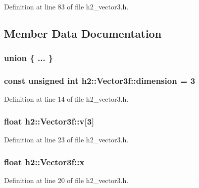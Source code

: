Definition at line 83 of file h2\-\_\-vector3.\-h.



\subsection{Member Data Documentation}
\hypertarget{classh2_1_1_vector3f_ab65d75ee198a9ae00e7fb5f0f8bb0b03}{\subsubsection[{"@17}]{\setlength{\rightskip}{0pt plus 5cm}union \{ ... \} }}\label{classh2_1_1_vector3f_ab65d75ee198a9ae00e7fb5f0f8bb0b03}
\hypertarget{classh2_1_1_vector3f_a96a96e43b738e0a0d901789016f16e09}{
\subsubsection[{dimension}]{\setlength{\rightskip}{0pt plus 5cm}const unsigned int h2\-::\-Vector3f\-::dimension = 3\hspace{0.3cm}{\ttfamily [static]}}}\label{classh2_1_1_vector3f_a96a96e43b738e0a0d901789016f16e09}


Definition at line 14 of file h2\-\_\-vector3.\-h.

\hypertarget{classh2_1_1_vector3f_a7a9aebc0837d01f25767a8ccfbb3159c}{
\subsubsection[{v}]{\setlength{\rightskip}{0pt plus 5cm}float h2\-::\-Vector3f\-::v\mbox{[}3\mbox{]}}}\label{classh2_1_1_vector3f_a7a9aebc0837d01f25767a8ccfbb3159c}


Definition at line 23 of file h2\-\_\-vector3.\-h.

\hypertarget{classh2_1_1_vector3f_ab3cc458a2c088d8ecc160a1aaf3fc81d}{
\subsubsection[{x}]{\setlength{\rightskip}{0pt plus 5cm}float h2\-::\-Vector3f\-::x}}\label{classh2_1_1_vector3f_ab3cc458a2c088d8ecc160a1aaf3fc81d}


Definition at line 20 of file h2\-\_\-vector3.\-h.

